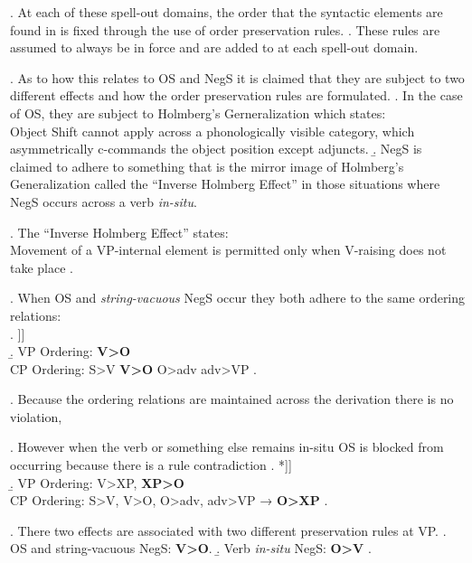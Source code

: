 \documentclass[12pt, letterpaper]{article}
\begin{document}
\ex. At each of these spell-out domains, the order that the syntactic elements are found in is fixed through the use of order preservation rules. 
\a. These rules are assumed to always be in force and are added to at each spell-out domain. 

\ex. As to how this relates to OS and NegS it is claimed that they are subject to two different effects and how the order preservation rules are formulated.
\a. In the case of OS, they are subject to Holmberg's Gerneralization which states:\\
Object Shift cannot apply across a phonologically visible category, which asymmetrically c-commands the object position except adjuncts.
\b. NegS is claimed to adhere to something that is the mirror image of Holmberg's Generalization called the “Inverse Holmberg Effect” \citep{engelsScandinavianNegativeIndefinites2012} in those situations where NegS occurs across a verb \textit{in-situ}.

\ex. The “Inverse Holmberg Effect” states:\\
Movement of a VP-internal element is permitted only when V-raising does not take place \citep[30]{foxCyclicLinearizationSyntactic2005}.

\ex. When OS and \textit{string-vacuous} NegS occur they both adhere to the same ordering relations: \\
\a.
\I[CP S \rnode{b1}V … \I[NegP \rnode{A1}O adv \I[VP \rnode{b2}t\textsubscript{v} \rnode{A2}t\textsubscript{o} ]]]
\\
\b. VP Ordering: \textbf{V>O}\\
CP Ordering: S>V \textbf{V>O} O>adv adv>VP
\z.

\ex. Because the ordering relations are maintained across the derivation there is no violation, 

\ex. However when the verb  or something else remains in-situ OS is blocked from occurring because there is a rule contradiction
\a. *\I[CP S \rnode{b1}V … \I[NegP \rnode{A1}O adv \I[VP \rnode{b2}t XP \textsubscript{v} \rnode{A2}t\textsubscript{o} ]]]
\\
\b. VP Ordering: V>XP, \textbf{XP>O} \\
CP Ordering: S>V, V>O, O>adv, adv>VP → \textbf{O>XP}
\z.

\ex. There two effects are associated with two different preservation rules at VP. 
\a.  OS and string-vacuous NegS: \textbf{V>O}. 
\b. Verb \textit{in-situ} NegS: \textbf{O>V}
\z.
\end{document}
